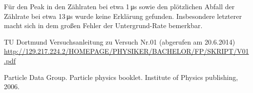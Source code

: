 Für den Peak in den Zählraten bei etwa 1\,\si{\micro\second} sowie den plötzlichen Abfall der Zählrate bei etwa 13\,\si{\micro\second} wurde keine Erklärung gefunden. Insbesondere letzterer macht sich in dem großen Fehler der Untergrund-Rate bemerkbar.

\vfill
\begin{thebibliography}{WissOnl}
 TU Dortmund Versuchsanleitung zu Versuch Nr.01 (abgerufen am 20.6.2014) \url{http://129.217.224.2/HOMEPAGE/PHYSIKER/BACHELOR/FP/SKRIPT/V01.pdf}

 Particle Data Group. Particle physics booklet. Institute of Physics publishing, 2006.

\end{thebibliography}

